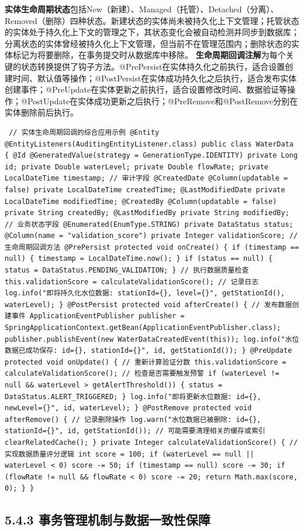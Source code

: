 \textbf{实体生命周期状态}包括New（新建）、Managed（托管）、Detached（分离）、Removed（删除）四种状态。新建状态的实体尚未被持久化上下文管理；托管状态的实体处于持久化上下文的管理之下，其状态变化会被自动检测并同步到数据库；分离状态的实体曾经被持久化上下文管理，但当前不在管理范围内；删除状态的实体标记为将要删除，在事务提交时从数据库中移除。 \textbf{生命周期回调注解}为每个关键的状态转换提供了钩子方法。@PrePersist在实体持久化之前执行，适合设置创建时间、默认值等操作；@PostPersist在实体成功持久化之后执行，适合发布实体创建事件；@PreUpdate在实体更新之前执行，适合设置修改时间、数据验证等操作；@PostUpdate在实体成功更新之后执行；@PreRemove和@PostRemove分别在实体删除前后执行。 \begin{verbatim} // 实体生命周期回调的综合应用示例 @Entity @EntityListeners(AuditingEntityListener.class) public class WaterData { @Id @GeneratedValue(strategy = GenerationType.IDENTITY) private Long id; private Double waterLevel; private Double flowRate; private LocalDateTime timestamp; // 审计字段 @CreatedDate @Column(updatable = false) private LocalDateTime createdTime; @LastModifiedDate private LocalDateTime modifiedTime; @CreatedBy @Column(updatable = false) private String createdBy; @LastModifiedBy private String modifiedBy; // 业务状态字段 @Enumerated(EnumType.STRING) private DataStatus status; @Column(name = "validation_score") private Integer validationScore; // 生命周期回调方法 @PrePersist protected void onCreate() { if (timestamp == null) { timestamp = LocalDateTime.now(); } if (status == null) { status = DataStatus.PENDING_VALIDATION; } // 执行数据质量检查 this.validationScore = calculateValidationScore(); // 记录日志 log.info("即将持久化水位数据: stationId={}, level={}", getStationId(), waterLevel); } @PostPersist protected void afterCreate() { // 发布数据创建事件 ApplicationEventPublisher publisher = SpringApplicationContext.getBean(ApplicationEventPublisher.class); publisher.publishEvent(new WaterDataCreatedEvent(this)); log.info("水位数据已成功保存: id={}, stationId={}", id, getStationId()); } @PreUpdate protected void onUpdate() { // 重新计算验证分数 this.validationScore = calculateValidationScore(); // 检查是否需要触发预警 if (waterLevel != null && waterLevel > getAlertThreshold()) { status = DataStatus.ALERT_TRIGGERED; } log.info("即将更新水位数据: id={}, newLevel={}", id, waterLevel); } @PostRemove protected void afterRemove() { // 记录删除操作 log.warn("水位数据已被删除: id={}, stationId={}", id, getStationId()); // 可能需要清理相关的缓存或索引 clearRelatedCache(); } private Integer calculateValidationScore() { // 实现数据质量评分逻辑 int score = 100; if (waterLevel == null || waterLevel < 0) score -= 50; if (timestamp == null) score -= 30; if (flowRate != null && flowRate < 0) score -= 20; return Math.max(score, 0); } } \end{verbatim} \subsection{5.4.3 事务管理机制与数据一致性保障}\label{ux4e8bux52a1ux7ba1ux7406ux673aux5236ux4e0eux6570ux636eux4e00ux81f4ux6027ux4fddux969c} 